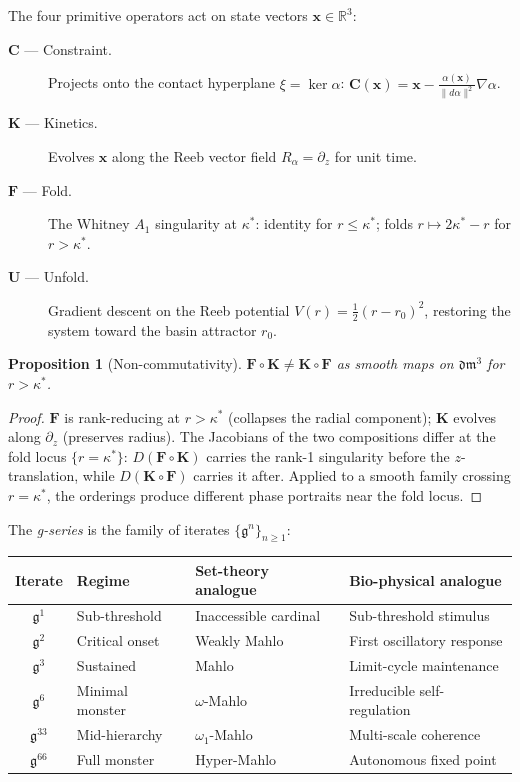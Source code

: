 \documentclass[12pt,a4paper]{amsart}
\newtheorem{proposition}[theorem]{Proposition}
\theoremstyle{definition}
\theoremstyle{remark}
\newcommand{\Cop}{\mathbf{C}}
\newcommand{\Kop}{\mathbf{K}}
\newcommand{\Fop}{\mathbf{F}}
\newcommand{\Uop}{\mathbf{U}}
\newcommand{\GG}{\mathfrak{g}}
\newcommand{\dm}{\mathfrak{dm}^3}
\newcommand{\kap}{\kappa^*}
\begin{document}
The four primitive operators act on state vectors $\mathbf{x} \in \mathbb{R}^3$:

\begin{description}
  \item[$\Cop$ --- Constraint.] Projects onto the contact hyperplane
    $\xi = \ker\alpha$: $\Cop(\mathbf{x}) = \mathbf{x} - \tfrac{\alpha(\mathbf{x})}{\|d\alpha\|^2}\nabla\alpha$.
  \item[$\Kop$ --- Kinetics.] Evolves $\mathbf{x}$ along the Reeb vector field
    $R_\alpha = \partial_z$ for unit time.
  \item[$\Fop$ --- Fold.] The Whitney $A_1$ singularity at $\kap$: identity for
    $r \leq \kap$; folds $r \mapsto 2\kap - r$ for $r > \kap$.
  \item[$\Uop$ --- Unfold.] Gradient descent on the Reeb potential
    $V(r) = \tfrac{1}{2}(r-r_0)^2$, restoring the system toward the basin attractor $r_0$.
\end{description}

\begin{proposition}[Non-commutativity]\label{prop:noncomm}
$\Fop \circ \Kop \neq \Kop \circ \Fop$ as smooth maps on $\dm$ for $r > \kap$.
\end{proposition}
\begin{proof}
$\Fop$ is rank-reducing at $r > \kap$ (collapses the radial component); $\Kop$ evolves
along $\partial_z$ (preserves radius). The Jacobians of the two compositions differ at
the fold locus $\{r = \kap\}$: $D(\Fop \circ \Kop)$ carries the rank-1 singularity
before the $z$-translation, while $D(\Kop \circ \Fop)$ carries it after. Applied to a
smooth family crossing $r = \kap$, the orderings produce different phase portraits near
the fold locus.
\end{proof}

The \emph{g-series} is the family of iterates $\{\GG^n\}_{n \geq 1}$:

\begin{center}
\small
\begin{tabular}{@{}clll@{}}
\toprule
Iterate & Regime & Set-theory analogue & Bio-physical analogue \\
\midrule
$\GG^1$ & Sub-threshold  & Inaccessible cardinal & Sub-threshold stimulus \\
$\GG^2$ & Critical onset & Weakly Mahlo & First oscillatory response \\
$\GG^3$ & Sustained       & Mahlo                 & Limit-cycle maintenance \\
$\GG^6$ & Minimal monster & $\omega$-Mahlo        & Irreducible self-regulation \\
$\GG^{33}$ & Mid-hierarchy & $\omega_1$-Mahlo    & Multi-scale coherence \\
$\GG^{66}$ & Full monster  & Hyper-Mahlo          & Autonomous fixed point \\
\bottomrule
\end{tabular}
\end{center}
\end{document}
